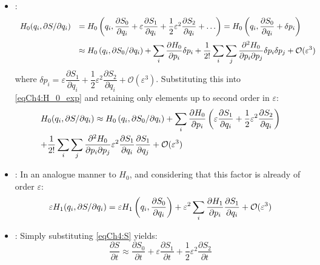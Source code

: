 		\begin{itemize}
		\item[\GMVred{$\bullet$}] :
		\begin{equation}
		\begin{array}{lll}
		H_0(q_i, \partial S/\partial q_i) & = H_0\left( q_i, \dfrac{\partial S_0}{\partial q_i} + \varepsilon \dfrac{\partial S_1}{\partial q_i} + \dfrac{1}{2} \varepsilon^2 \dfrac{\partial S_2}{\partial q_i} + \ldots \right) = H_0\left( q_i, \dfrac{\partial S_0}{\partial q_i} +\delta p_i\right) \\[1.2em]
			&  \approx H_0\left( q_i, \partial S_0/\partial q_i\right) + \displaystyle\sum_{i} \dfrac{\partial H_0}{\partial p_i} \delta p_i + \dfrac{1}{2!} \displaystyle\sum_i \displaystyle\sum_j \dfrac{\partial^2 H_0}{\partial p_i \partial p_j} \delta p_i \delta p_j + \mathcal{O}(\varepsilon^3) 
		\end{array}	
		\label{eqCh4:H_0_exp}
		\end{equation}
		\noindent where $\delta p_i = \varepsilon \dfrac{\partial S_1}{\partial q_i} + \dfrac{1}{2} \varepsilon^2 \dfrac{\partial S_2}{\partial q_i} + \mathcal{O}(\varepsilon^3)$. Substituting this into \eqref{eqCh4:H_0_exp} and retaining only elements up to second order in $\varepsilon$:
		\begin{equation}
		\begin{array}{lll}
		H_0(q_i, \partial S/\partial q_i)  \approx H_0\left( q_i, \partial S_0/\partial q_i\right) + \displaystyle\sum_{i} \dfrac{\partial H_0}{\partial p_i} \left(\varepsilon \dfrac{\partial S_1}{\partial q_i} + \dfrac{1}{2} \varepsilon^2 \dfrac{\partial S_2}{\partial q_i}\right)\\[1.2em]
		 + \dfrac{1}{2!} \displaystyle\sum_i \displaystyle\sum_j \dfrac{\partial^2 H_0}{\partial p_i \partial p_j} \varepsilon^2 \dfrac{\partial S_1}{\partial q_i}\dfrac{\partial S_1}{\partial q_j} + \mathcal{O}(\varepsilon^3)
		\end{array}
		\label{eqCh4:H_0_exp_final}
		\end{equation}
		\item[\GMVred{$\bullet$}]: In an analogue manner to $H_0$, and considering that this factor is already of order $\varepsilon$:
		\begin{equation}
		\varepsilon H_1(q_i, \partial S /\partial q_i ) = \varepsilon H_1\left( q_i, \dfrac{\partial S_0}{\partial q_i}\right) + \varepsilon^2 \displaystyle\sum_{i} \dfrac{\partial H_1}{\partial p_i} \dfrac{\partial S_1}{\partial q_i} + \mathcal{O}(\varepsilon^3)
		\label{eqCh4:H_1_exp_final}
		\end{equation}
		\item[\GMVred{$\bullet$}]: Simply substituting \eqref{eqCh4:S} yields:
		\begin{equation}
		\dfrac{\partial S}{\partial t} \approx \dfrac{\partial S_0}{\partial t} + \varepsilon \dfrac{\partial S_1}{\partial t} + \dfrac{1}{2} \varepsilon^2 \dfrac{\partial S_2}{\partial t}
		\label{eqCh4:S_t}
		\end{equation}
		\end{itemize}
